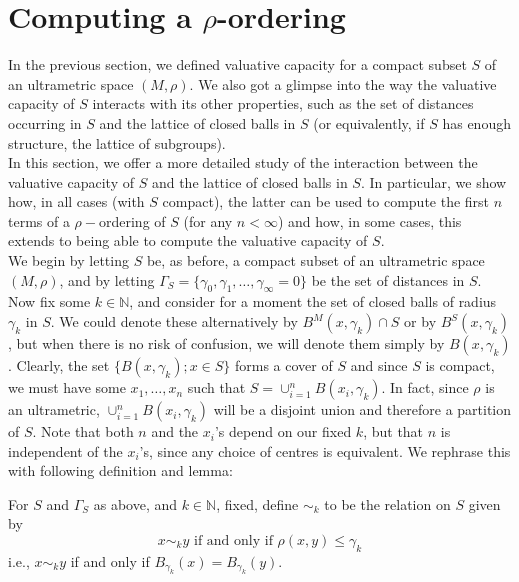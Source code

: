 
\newpage

\section*{Computing a $\rho$-ordering}
In the previous section, we defined valuative capacity for a compact subset $S$ of an ultrametric space $(M, \rho)$. We also got a glimpse into the way the valuative capacity of $S$ interacts with its other properties, such as the set of distances occurring in $S$ and the lattice of closed balls in $S$ (or equivalently, if $S$ has enough structure, the lattice of subgroups).\\

In this section, we offer a more detailed study of the interaction between the valuative capacity of $S$ and the lattice of closed balls in $S$. In particular, we  show how, in all cases (with $S$ compact), the latter can be used to compute the first $n$ terms of a $\rho-$ordering of $S$ (for any $n < \infty$) and how, in some cases, this extends to being able to compute the valuative capacity of $S$.\\

We begin by letting $S$ be, as before,  a compact subset of an ultrametric space $(M, \rho)$, and by letting $\Gamma_S =\{\gamma_0, \gamma_1,\ldots,\gamma_\infty=0\}$ be the set of distances in $S$.  Now fix some $k \in \mathbb{N}$, and consider for a moment the set of closed balls of radius $\gamma_k$ in $S$. We could denote these alternatively by $B^M(x, \gamma_k) \cap S$ or by  $B^S(x, \gamma_k)$, but when there is no risk of confusion, we will denote them simply by $B(x, \gamma_k)$. Clearly, the set  $\{B(x, \gamma_k); x \in S\}$ forms a cover of $S$ and since $S$ is compact, we must have some $x_1,\ldots, x_n$  such that $S= \cup_{i=1}^n B(x_i, \gamma_k)$. In fact,  since $\rho$ is an ultrametric, $\cup_{i=1}^n B(x_i, \gamma_k)$ will be a disjoint union and therefore a partition of $S$. Note that both $n$ and the $x_i$'s depend on our fixed $k$, but that $n$ is independent of the $x_i$'s, since any choice of centres is equivalent. We rephrase this with following definition and lemma:

\begin{definition*}
For $S$ and $\Gamma_S$ as above, and $k \in \mathbb{N}$, fixed,  define $\sim_k$ to  be the relation on $S$ given by \[x \sim_k y\text{ if and only if  }\rho(x,y) \leq \gamma_k\] i.e.,  $x \sim_k y$ if and only if $B_{\gamma_k}(x) = B_{\gamma_k}(y)$.
\end{definition*}

